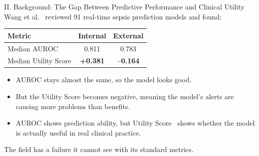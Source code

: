 \begin{frame}{II. Background: The Gap Between Predictive Performance and
              Clinical Utility}
Wang et al.~\cite{wang2025srpm} reviewed 91 real-time sepsis prediction
models and found:

\vspace{2pt}
\begin{center}\tablestyle\footnotesize
\begin{tabular}{lcc}
\toprule
\textbf{Metric} & \textbf{Internal} & \textbf{External} \\
\midrule
Median AUROC         & 0.811           & 0.783 \\
Median Utility Score & \textbf{+0.381} & \textbf{--0.164} \\
\bottomrule
\end{tabular}
\end{center}

\vspace{2pt}
\begin{itemize}\itemsep1pt\small
  \item AUROC stays almost the same, so the model looks good.
  \item But the Utility Score becomes negative, meaning the model's alerts
        are causing more problems than benefits.
  \item AUROC shows prediction ability, but Utility
        Score~\cite{reyna2020utility} shows whether the model is actually
        useful in real clinical practice.
\end{itemize}

\vspace{2pt}
\begin{alertblock}{}
  \centering The field has a failure it cannot see with its standard metrics.
\end{alertblock}
\end{frame}



